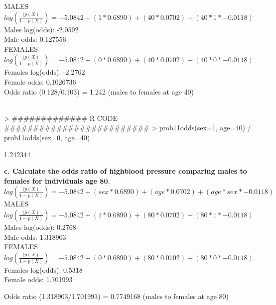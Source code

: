 \documentclass{article}
\begin{document}
\noindent MALES $ log(\frac{(p(X)}{1-p(X)}) = -5.0842 + (1*0.6890) + (40*0.0702) + (40*1*-0.0118)$\\
Males log(odds): -2.0592 \\
Male odds: 0.127556\\

\noindent FEMALES $ log(\frac{(p(X)}{1-p(X)}) = -5.0842 + (0*0.6890) + (40*0.0702) + (40*0*-0.0118)$\\
Females log(odds): -2.2762 \\
Female odds: 0.1026736 \\

\noindent Odds ratio (0.128/0.103) = 1.242 (males to females at age 40) \\

 \\

\begin{Schunk}
\begin{Sinput}
> ############# R CODE #########################
> prob11odds(sex=1, age=40) / prob11odds(sex=0, age=40)
\end{Sinput}
\begin{Soutput}
[1] 1.242344
\end{Soutput}
\end{Schunk}



\noindent \textbf{c. Calculate the odds ratio of highblood pressure comparing males to females for individuals age 80.} \\

\noindent $ log(\frac{(p(X)}{1-p(X)}) = -5.0842 + (sex*0.6890) + (age*0.0702) + (age*sex*-0.0118)$\\

\noindent MALES $ log(\frac{(p(X)}{1-p(X)}) = -5.0842 + (1*0.6890) + (80*0.0702) + (80*1*-0.0118)$\\
Males log(odds): 0.2768 \\
Male odds: 1.318903 \\


\noindent FEMALES $ log(\frac{(p(X)}{1-p(X)}) = -5.0842 + (0*0.6890) + (80*0.0702) + (80*0*-0.0118)$\\
Females log(odds): 0.5318 \\
Female odds: 1.701993


\noindent Odds ratio (1.318903/1.701993) = 0.7749168 (males to females at age 80) \\
\end{document}
